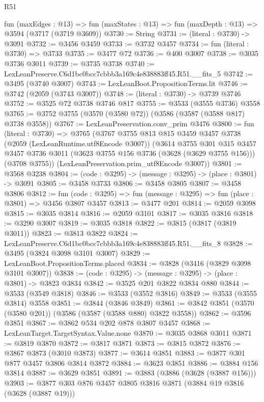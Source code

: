 \begin{lexlean}{R51}
\begin{coremodule}
  fun (maxEdges : @13) =>
  fun (maxStates : @13) => fun (maxDepth : @13) => @3594 (@3717 (@3719 @3609))
@3730 := String
@3731 := (literal : @3730) -> @3091
@3732 := @3456 @3459
@3733 := @3732 @3457
@3734 := fun (literal : @3730) => @3733
@3735 := @3477 @72
@3736 := @400 @3007
@3738 := @3035 @3736 @3011
@3739 := @3735 @3738
@3740 := LexLeanPreserve.C6d1bc0bcc7cbbb3a169c4e838883ff45.R51.__fits_5
@3742 := @3495 (@3740 @3007)
@3743 := LexLeanBoot.PropositionTerms.lit
@3746 := @3742 (@2059 (@3743 @3007))
@3748 := (literal : @3730) -> @3739 @3746
@3752 := @3525 @72 @3738 @3746 @817
@3755 := @3533 (@3555 @3736) @3558
@3765 := @3752 @3755 (@3570 (@3580 @72)) (@3586 (@3587 (@3588 @817) @3738 @3558))
@3767 := LexLeanPreservation.conv_prim @3476
@3800 := fun (literal : @3730) =>
  @3765
    (@3767
      @3755
      @813
      @815
      @3459
      @3457
      @3738
      (@2059 (LexLeanRuntime.utf8Encode @3007))
      (@3614
        @3755
        @301
        @315
        @3457
        @3457
        @3736
        @3011
        (@3623 @3755 @156 @3736 (@3628 (@3629 @3755 @156)))
        (@3708 @3755))
      (LexLeanPreservation.prim_utf8Encode @3007))
@3801 := @3568 @3238
@3804 := (code : @3295) -> (message : @3295) -> (place : @3801) -> @3091
@3805 := @3458 @3733
@3806 := @3458 @3805
@3807 := @3458 @3806
@3812 := fun (code : @3295) => fun (message : @3295) => fun (place : @3801) => @3456 @3807 @3457
@3813 := @3477 @201
@3814 := @2059 @3098
@3815 := @3035 @3814
@3816 := @2059 @3101
@3817 := @3035 @3816
@3818 := @3290 @3007
@3819 := @3035 @3818
@3822 := @3815 (@3817 (@3819 @3011))
@3823 := @3813 @3822
@3824 := LexLeanPreserve.C6d1bc0bcc7cbbb3a169c4e838883ff45.R51.__fits_8
@3828 := @3495 (@3824 @3098 @3101 @3007)
@3829 := LexLeanBoot.PropositionTerms.placed
@3834 := @3828 (@3416 (@3829 @3098 @3101 @3007))
@3838 := (code : @3295) -> (message : @3295) -> (place : @3801) -> @3823 @3834
@3842 := @3525 @201 @3822 @3834 @880
@3844 := @3533 (@3549 @3818)
@3846 := @3533 (@3552 @3816)
@3849 := @3533 (@3555 @3814) @3558
@3851 := @3844 (@3846 @3849)
@3861 := @3842 @3851 (@3570 (@3580 @201)) (@3586 (@3587 (@3588 @880) @3822 @3558))
@3862 := @3596 @3851
@3867 := @3862 @534 @202 @878 @3807 @3457
@3868 := LexLeanTarget.TargetSyntax.Value.none
@3870 := @3035 @3868 @3011
@3871 := @3819 @3870
@3872 := @3817 @3871
@3873 := @3815 @3872
@3876 := @3867 @3873 (@3010 @3873)
@3877 := @3614 @3851
@3883 := @3877 @301 @877 @3457 @3806 @3814 @3872
@3884 := @3623 @3851
@3886 := @3884 @156 @3814
@3887 := @3629 @3851
@3891 := @3883 (@3886 (@3628 (@3887 @156)))
@3903 := @3877 @303 @876 @3457 @3805 @3816 @3871 (@3884 @19 @3816 (@3628 (@3887 @19)))

\end{coremodule}
\end{lexlean}
